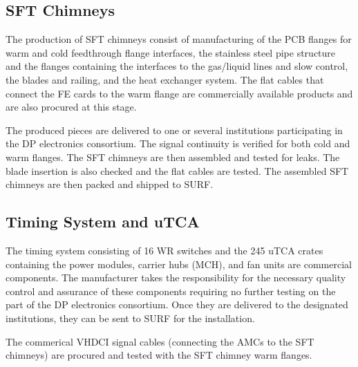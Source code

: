 \subsection{SFT Chimneys}
\label{sec:fddp-tpc-elec-prod-sft}
The production of SFT chimneys consist of manufacturing of the PCB flanges for warm and cold feedthrough flange interfaces, the stainless steel pipe structure and the flanges containing the interfaces to the gas/liquid lines and slow control, the blades and railing, and the heat exchanger system. The flat cables that connect the FE cards to the warm flange are commercially available products and are also procured at this stage.

The produced pieces are delivered to one or several institutions participating in the DP electronics consortium. The signal continuity is verified for both cold and warm flanges. The SFT chimneys are then assembled and tested for leaks. The blade insertion is also checked and the flat cables are tested. The assembled SFT chimneys are then packed and shipped to SURF. 

\subsection{Timing System and uTCA}
\label{sec:fddp-tpc-elec-prod-utca}

The timing system consisting of \num{16} WR switches and the \num{245} uTCA crates containing the power modules, carrier hubs (MCH), and fan units are commercial components. The manufacturer takes the responsibility for the necessary quality control and assurance of these components requiring no further testing on the part of the DP electronics consortium. Once they are delivered to the designated institutions, they can be sent to SURF for the installation. 

The commerical VHDCI signal cables (connecting the AMCs to the SFT chimneys) are procured and tested with the SFT chimney warm flanges.



